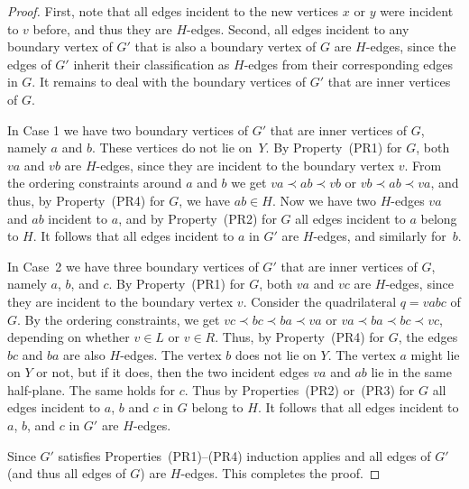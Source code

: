 \begin{proof}
	First, note that all edges incident to the new vertices $x$ or $y$
	were incident to $v$ before, and thus they are $H$-edges. Second,
	all edges incident to any boundary vertex of $G'$ that is also
	a boundary vertex of $G$ are $H$-edges, since the edges of $G'$
	inherit their classification as $H$-edges from their corresponding
	edges in $G$. It remains to deal with the boundary vertices of
	$G'$ that are inner vertices of $G$.

	In Case 1 we have two boundary vertices of $G'$ that are
	inner vertices of $G$, namely $a$ and $b$. These vertices
	do not lie on~$Y$. By Property~(PR1) for $G$, both $va$ and
	$vb$ are $H$-edges, since they are incident to the boundary
	vertex $v$. From the ordering constraints around $a$ and $b$
	we get $va\prec ab\prec vb$ or $vb\prec ab\prec va$, and thus,
	by Property~(PR4) for $G$, we have $ab\in H$.  Now we have two
	$H$-edges $va$ and $ab$ incident to $a$, and by Property~(PR2)
	for $G$ all edges incident to $a$ belong to $H$. It follows that
	all edges incident to $a$ in $G'$ are $H$-edges, and similarly
	for~$b$.

	In Case~2 we have three boundary vertices of $G'$ that are inner
	vertices of $G$, namely $a$, $b$, and $c$. By Property~(PR1) for
	$G$, both $va$ and $vc$ are $H$-edges, since they are incident
	to the boundary vertex $v$. Consider the quadrilateral $q=vabc$
	of $G$. By the ordering constraints, we get $vc \prec bc\prec
	ba\prec va$ or $va \prec ba\prec bc\prec vc$, depending on
	whether $v\in L$ or $v\in R$. Thus, by Property~(PR4) for $G$,
	the edges $bc$ and $ba$ are also $H$-edges. The vertex $b$ does
	not lie on $Y$. The vertex $a$ might lie on $Y$ or not, but if it
	does, then the two incident edges $va$ and $ab$ lie in the same
	half-plane.  The same holds for $c$. Thus by Properties~(PR2)
	or~(PR3) for $G$ all edges incident to $a$, $b$ and $c$ in $G$
	belong to $H$. It follows that all edges incident to $a$, $b$,
	and $c$ in $G'$ are $H$-edges.
	
	
	
	Since $G'$ satisfies Properties~(PR1)--(PR4) induction applies and all edges of $G'$ (and thus all edges of $G$) are $H$-edges. This completes the proof.
\end{proof}

